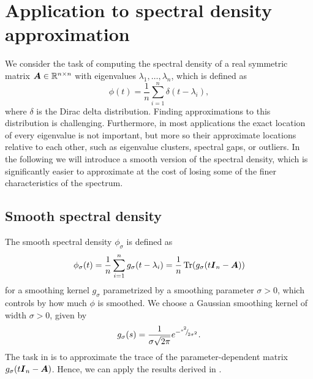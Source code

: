\documentclass[12pt]{article}
\begin{document}
\section{Application to spectral density approximation}
\label{sec:application}

We consider the task of computing the spectral density of a real symmetric matrix $\boldsymbol{A} \in \mathbb{R}^{n \times n}$ with eigenvalues $\lambda_1, \dots, \lambda_n$, which is defined as
\begin{equation}
    \phi(t) = \frac{1}{n} \sum_{i=1}^{n} \delta(t - \lambda_i),
    \label{equ:spectral-density}
\end{equation}
where $\delta$ is the Dirac delta distribution. Finding approximations to this distribution is challenging. Furthermore, in most applications the exact location of every eigenvalue is not important, but more so their approximate locations relative to each other, such as eigenvalue clusters, spectral gaps, or outliers. In the following we will introduce a smooth version of the spectral density, which is significantly easier to approximate at the cost of losing some of the finer characteristics of the spectrum.

\subsection{Smooth spectral density}
\label{subsec:spectral-density}

The smooth spectral density $\phi_{\sigma}$ is defined as
\begin{equation}
    \phi_{\sigma}(t) = \frac{1}{n} \sum_{i=1}^{n} g_{\sigma}(t - \lambda_i) = \frac{1}{n} \operatorname{Tr}(g_{\sigma}(t\boldsymbol{I}_n - \boldsymbol{A}))
    \label{equ:smooth-spectral-density}
\end{equation}
for a smoothing kernel $g_{\sigma}$ parametrized by a smoothing parameter $\sigma > 0$, which controls by how much $\phi$ is smoothed. We choose a Gaussian smoothing kernel of width $\sigma > 0$, given by
\begin{equation}
    g_{\sigma}(s) = \frac{1}{\sigma \sqrt{2\pi}} e^{-{}^{s^2}{\mskip -5mu/\mskip -3mu}_{2\sigma^2}}.
    \label{equ:smoothing-kernel}
\end{equation}
The task in  is to approximate the trace of the parameter-dependent matrix $g_{\sigma}(t\boldsymbol{I}_n - \boldsymbol{A})$. Hence, we can apply the results derived in .
\end{document}
